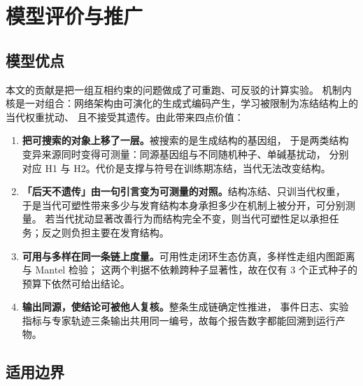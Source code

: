 \section{模型评价与推广}\label{sec:evaluation}\label{sec:limitations}

\subsection{模型优点}

本文的贡献是把一组互相约束的问题做成了可重跑、可反驳的计算实验。
机制内核是一对组合：网络架构由可演化的生成式编码产生，学习被限制为冻结结构上的当代权重扰动、
且不接受其遗传。由此带来四点价值：

\begin{enumerate}
  \item \textbf{把可搜索的对象上移了一层。}被搜索的是生成结构的基因组，
        于是两类结构变异来源同时变得可测量：同源基因组与不同随机种子、单碱基扰动，
        分别对应 H1 与 H2。代价是支撑与符号在训练期冻结，当代无法改变结构。
  \item \textbf{「后天不遗传」由一句引言变为可测量的对照。}结构冻结、只训当代权重，
        于是当代可塑性带来多少与发育结构本身承担多少在机制上被分开，可分别测量。
        若当代扰动显著改善行为而结构完全不变，则当代可塑性足以承担任务；反之则负担主要在发育结构。
  \item \textbf{可用与多样在同一条链上度量。}可用性走闭环生态仿真，多样性走组内图距离与 Mantel 检验；
        这两个判据不依赖跨种子显著性，故在仅有 3 个正式种子的预算下依然可给出结论。
  \item \textbf{输出同源，使结论可被他人复核。}整条生成链确定性推进，
        事件日志、实验指标与专家轨迹三条输出共用同一编号，故每个报告数字都能回溯到运行产物。
\end{enumerate}

\subsection{适用边界}

